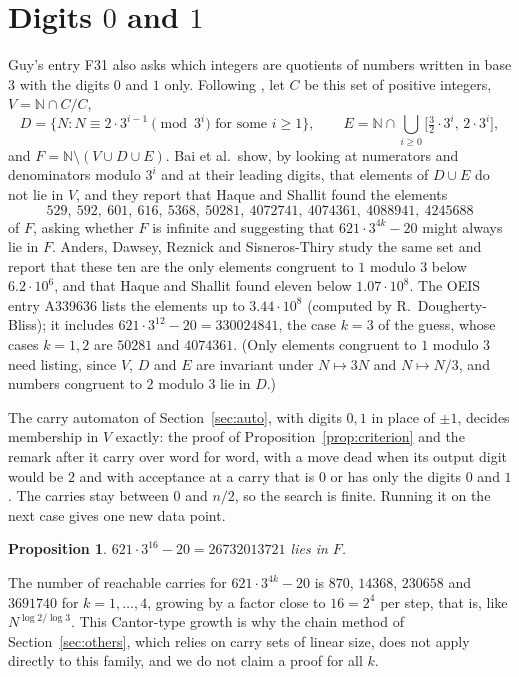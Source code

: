 \documentclass[11pt]{amsart}
\newtheorem{proposition}[theorem]{Proposition}
\theoremstyle{definition}
\newcommand{\N}{\mathbb{N}}
\begin{document}
\section{Digits \texorpdfstring{$0$}{0} and \texorpdfstring{$1$}{1}}\label{sec:cantor}

Guy's entry F31 also asks which integers are quotients of numbers written in base $3$ with the digits
$0$ and $1$ only. Following \cite{BMRS}, let $C$ be this set of positive integers,
$V=\N\cap C/C$,
\[
D=\{N : N\equiv 2\cdot 3^{i-1}\pmod{3^i}\text{ for some }i\ge 1\},\qquad
E=\N\cap\bigcup_{i\ge 0}\bigl[\tfrac32\cdot 3^i,\,2\cdot 3^i\bigr],
\]
and $F=\N\setminus(V\cup D\cup E)$. Bai et al.\ show, by looking at numerators and denominators modulo
$3^i$ and at their leading digits, that elements of $D\cup E$ do not lie in $V$, and they report that
Haque and Shallit found the elements
\[
529,\ 592,\ 601,\ 616,\ 5368,\ 50281,\ 4072741,\ 4074361,\ 4088941,\ 4245688
\]
of $F$, asking whether $F$ is infinite and suggesting that $621\cdot 3^{4k}-20$ might always lie in $F$.
Anders, Dawsey, Reznick and Sisneros-Thiry \cite{ADRS} study the same set and report that these ten are
the only elements congruent to $1$ modulo $3$ below $6.2\cdot 10^6$, and that Haque and Shallit found
eleven below $1.07\cdot 10^8$. The OEIS entry A339636 \cite{OEIS} lists the elements up to
$3.44\cdot 10^8$ (computed by R.~Dougherty-Bliss); it includes $621\cdot 3^{12}-20=330024841$, the case
$k=3$ of the guess, whose cases $k=1,2$ are $50281$ and $4074361$. (Only elements congruent to $1$
modulo $3$ need listing, since $V$, $D$ and $E$ are invariant under $N\mapsto 3N$ and $N\mapsto N/3$,
and numbers congruent to $2$ modulo $3$ lie in $D$.)

The carry automaton of Section~\ref{sec:auto}, with digits $0,1$ in place of $\pm1$, decides
membership in $V$ exactly: the proof of Proposition~\ref{prop:criterion} and the remark after it carry
over word for word, with a move dead when its output digit would be $2$ and with acceptance at a
carry that is $0$ or has only the digits $0$ and $1$. The carries stay between $0$ and $n/2$, so the
search is finite. Running it on the next case gives one new data point.

\begin{proposition}\label{prop:cantor}
$621\cdot 3^{16}-20=26732013721$ lies in $F$.
\end{proposition}

The number of reachable carries for $621\cdot 3^{4k}-20$ is $870$, $14368$, $230658$ and $3691740$ for
$k=1,\dots,4$, growing by a factor close to $16=2^4$ per step, that is, like $N^{\log 2/\log 3}$. This
Cantor-type growth is why the chain method of Section~\ref{sec:others}, which relies on carry sets of
linear size, does not apply directly to this family, and we do not claim a proof for all $k$.
\end{document}
